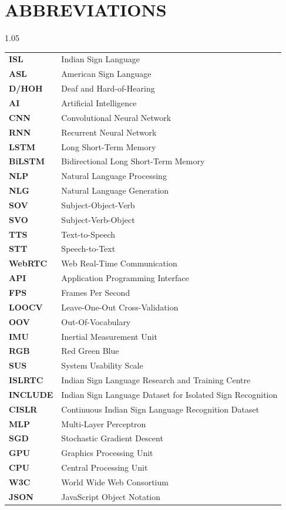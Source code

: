 \chapter*{ABBREVIATIONS}
\begin{spacing}{1.05}
\noindent
\begin{tabular}{ll}
  \textbf{ISL} & Indian Sign Language \\
  \textbf{ASL} & American Sign Language \\
  \textbf{D/HOH} & Deaf and Hard-of-Hearing \\
  \textbf{AI} & Artificial Intelligence \\
  \textbf{CNN} & Convolutional Neural Network \\
  \textbf{RNN} & Recurrent Neural Network \\
  \textbf{LSTM} & Long Short-Term Memory \\
  \textbf{BiLSTM} & Bidirectional Long Short-Term Memory \\
  \textbf{NLP} & Natural Language Processing \\
  \textbf{NLG} & Natural Language Generation \\
  \textbf{SOV} & Subject-Object-Verb \\
  \textbf{SVO} & Subject-Verb-Object \\
  \textbf{TTS} & Text-to-Speech \\
  \textbf{STT} & Speech-to-Text \\
  \textbf{WebRTC} & Web Real-Time Communication \\
  \textbf{API} & Application Programming Interface \\
  \textbf{FPS} & Frames Per Second \\
  \textbf{LOOCV} & Leave-One-Out Cross-Validation \\
  \textbf{OOV} & Out-Of-Vocabulary \\
  \textbf{IMU} & Inertial Measurement Unit \\
  \textbf{RGB} & Red Green Blue \\
  \textbf{SUS} & System Usability Scale \\
  \textbf{ISLRTC} & Indian Sign Language Research and Training Centre \\
  \textbf{INCLUDE} & Indian Sign Language Dataset for Isolated Sign Recognition \\
  \textbf{CISLR} & Continuous Indian Sign Language Recognition Dataset \\
  \textbf{MLP} & Multi-Layer Perceptron \\
  \textbf{SGD} & Stochastic Gradient Descent \\
  \textbf{GPU} & Graphics Processing Unit \\
  \textbf{CPU} & Central Processing Unit \\
  \textbf{W3C} & World Wide Web Consortium \\
  \textbf{JSON} & JavaScript Object Notation \\
\end{tabular}   
\end{spacing}
